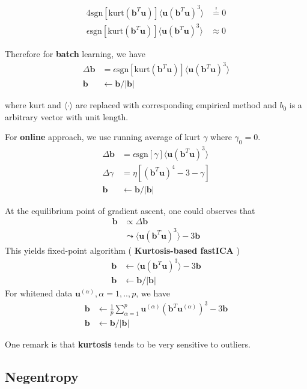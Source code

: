 \begin{align*}
	4\text{sgn}[ \text{kurt}(\boldsymbol{b}^T\boldsymbol{u}) ] \langle \boldsymbol{u}(\boldsymbol{b}^T \boldsymbol{u})^3 \rangle 
	&\stackrel{!}{=} 0 \\
	\epsilon	\text{sgn}[ \text{kurt}(\boldsymbol{b}^T\boldsymbol{u}) ] \langle \boldsymbol{u}(\boldsymbol{b}^T \boldsymbol{u})^3 \rangle 
		&\approx 0
\end{align*}

Therefore for \textbf{batch} learning, we have 
\begin{align*}
	\Delta \boldsymbol{b} &= \epsilon	\text{sgn}[ \text{kurt}(\boldsymbol{b}^T\boldsymbol{u}) ] \langle \boldsymbol{u}(\boldsymbol{b}^T \boldsymbol{u})^3 \rangle  \\
	\boldsymbol{b} &\leftarrow \boldsymbol{b} / |\boldsymbol{b}|
\end{align*}

where kurt and $\langle \cdot \rangle$ are replaced with corresponding empirical method and $b_0$ is a arbitrary vector with unit length.

For \textbf{online} approach, we use running average of kurt $\gamma$ where $\gamma_0 = 0$.
\begin{align*}
\Delta \boldsymbol{b} &= \epsilon	\text{sgn}[ \gamma ] \langle \boldsymbol{u}(\boldsymbol{b}^T \boldsymbol{u})^3 \rangle  \\
\Delta \gamma &= \eta[ (\boldsymbol{b}^T \boldsymbol{u} ) ^4 -3 -\gamma] \\
	\boldsymbol{b} &\leftarrow \boldsymbol{b} / |\boldsymbol{b}|	
\end{align*}

At the equilibrium point of gradient ascent, one could observes that  
\begin{align*}
\boldsymbol{b} &\propto \Delta \boldsymbol{b}  \\
&\leadsto \langle \boldsymbol{u}(\boldsymbol{b}^T \boldsymbol{u})^3 \rangle - 3\boldsymbol{b}
\end{align*}
This yields fixed-point algorithm ( \textbf{Kurtosis-based fastICA}   )
\begin{align*}
	\boldsymbol{b} &\leftarrow \langle \boldsymbol{u}(\boldsymbol{b}^T\boldsymbol{u})^3 \rangle - 3\boldsymbol{b} \\
	\boldsymbol{b} &\leftarrow \boldsymbol{b}/|\boldsymbol{b}|
\end{align*}
For whitened data $\boldsymbol{u}^{(\alpha)}, \alpha=1,..,p$, we have 
\begin{align*}
	\boldsymbol{b} &\leftarrow  \frac{1}{p} \sum_{\alpha=1}^{p}\boldsymbol{u}^{(\alpha)}(\boldsymbol{b}^T\boldsymbol{u}^{(\alpha)})^3 - 3\boldsymbol{b} \\
	\boldsymbol{b} &\leftarrow \boldsymbol{b}/|\boldsymbol{b}|
\end{align*}

One remark is that  \textbf{kurtosis} tends to be very sensitive to outliers.

\subsection{Negentropy}
